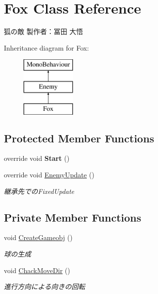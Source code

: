 \hypertarget{class_fox}{}\section{Fox Class Reference}
\label{class_fox}


狐の敵 製作者：冨田 大悟  


Inheritance diagram for Fox\+:\begin{figure}[H]
\begin{center}
\leavevmode
\includegraphics[height=3.000000cm]{class_fox}
\end{center}
\end{figure}
\subsection*{Protected Member Functions}
\begin{DoxyCompactItemize}
\item 
\mbox{\label{class_fox_afbb14366865df797dd4ab6dc2fd3e32a}} 
override void {\bfseries Start} ()
\item 
override void \hyperlink{class_fox_a34985f75859d53cd02305e84dfa8a058}{Enemy\+Update} ()
\begin{DoxyCompactList}\small\item\em 継承先での\+Fixed\+Update \end{DoxyCompactList}\end{DoxyCompactItemize}
\subsection*{Private Member Functions}
\begin{DoxyCompactItemize}
\item 
void \hyperlink{class_fox_a0b6f885799c2ab94dd5e12db47ccd2f2}{Create\+Gameobj} ()
\begin{DoxyCompactList}\small\item\em 球の生成 \end{DoxyCompactList}\item 
void \hyperlink{class_fox_a30e7733158c33fef25ae243aa45d6de4}{Chack\+Move\+Dir} ()
\begin{DoxyCompactList}\small\item\em 進行方向による向きの回転 \end{DoxyCompactList}\end{DoxyCompactItemize}
